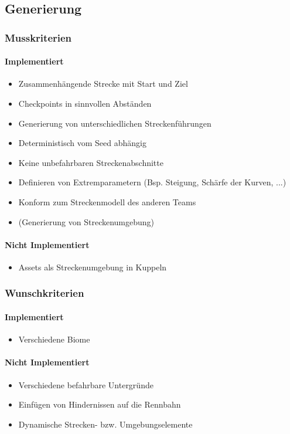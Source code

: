 \subsection{Generierung}
\subsubsection{Musskriterien}

\paragraph{Implementiert}
\begin{itemize}
    \item Zusammenhängende Strecke mit Start und Ziel
    \item Checkpoints in sinnvollen Abständen
    \item Generierung von unterschiedlichen Streckenführungen
    \item Deterministisch vom Seed abhängig
    \item Keine unbefahrbaren Streckenabschnitte
    \item Definieren von Extremparametern (Bsp. Steigung, Schärfe der Kurven, ...)
    \item Konform zum Streckenmodell des anderen Teams
    \item (Generierung von Streckenumgebung)
\end{itemize}

\paragraph{Nicht Implementiert}
\begin{itemize}
    \item Assets als Streckenumgebung in Kuppeln
\end{itemize}

\subsubsection{Wunschkriterien}

\paragraph{Implementiert}
\begin{itemize}
    \item Verschiedene Biome
		
\end{itemize}

\paragraph{Nicht Implementiert}
\begin{itemize}
    \item Verschiedene befahrbare Untergründe
	\item Einfügen von Hindernissen auf die Rennbahn
    \item Dynamische Strecken- bzw. Umgebungselemente
\end{itemize}